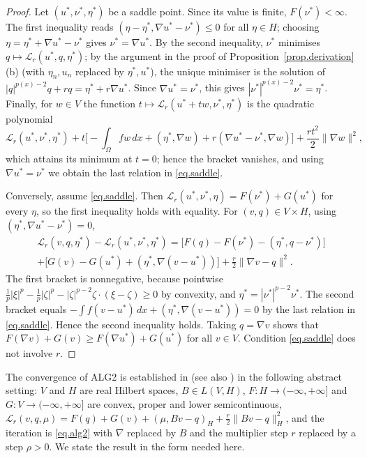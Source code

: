 \documentclass[11pt]{amsart}
\newcommand{\LL}{\mathcal L}
\newcommand{\dx}{\,dx}
\theoremstyle{definition}
\theoremstyle{remark}
\numberwithin{equation}{section}
\begin{document}
\begin{proof}
Let $(u^*,\nu^*,\eta^*)$ be a saddle point. Since its value is finite, $F(\nu^*)<\infty$. The first inequality reads $(\eta-\eta^*,\nabla u^*-\nu^*)\le 0$ for all $\eta\in H$; choosing $\eta=\eta^*+\nabla u^*-\nu^*$ gives $\nu^*=\nabla u^*$. By the second inequality, $\nu^*$ minimises $q\mapsto\LL_r(u^*,q,\eta^*)$; by the argument in the proof of Proposition~\ref{prop.derivation}(b) (with $\eta_n,u_n$ replaced by $\eta^*,u^*$), the unique minimiser is the solution of $|q|^{p(x)-2}q+rq=\eta^*+r\nabla u^*$. Since $\nabla u^*=\nu^*$, this gives $|\nu^*|^{p(x)-2}\nu^*=\eta^*$. Finally, for $w\in V$ the function $t\mapsto\LL_r(u^*+tw,\nu^*,\eta^*)$ is the quadratic polynomial
$$
\LL_r(u^*,\nu^*,\eta^*)+t\Big[-\int_\Omega fw\dx+(\eta^*,\nabla w)+r(\nabla u^*-\nu^*,\nabla w)\Big]+\frac{rt^2}2\|\nabla w\|^2,
$$
which attains its minimum at $t=0$; hence the bracket vanishes, and using $\nabla u^*=\nu^*$ we obtain the last relation in \eqref{eq.saddle}.

Conversely, assume \eqref{eq.saddle}. Then $\LL_r(u^*,\nu^*,\eta)=F(\nu^*)+G(u^*)$ for every $\eta$, so the first inequality holds with equality. For $(v,q)\in V\times H$, using $(\eta^*,\nabla u^*-\nu^*)=0$,
\begin{multline*}
\LL_r(v,q,\eta^*)-\LL_r(u^*,\nu^*,\eta^*)=\Big[F(q)-F(\nu^*)-(\eta^*,q-\nu^*)\Big]\\
+\Big[G(v)-G(u^*)+(\eta^*,\nabla(v-u^*))\Big]+\frac r2\|\nabla v-q\|^2 .
\end{multline*}
The first bracket is nonnegative, because pointwise $\frac1{p}|\xi|^{p}-\frac1p|\zeta|^p-|\zeta|^{p-2}\zeta\cdot(\xi-\zeta)\ge0$ by convexity, and $\eta^*=|\nu^*|^{p-2}\nu^*$. The second bracket equals $-\int f(v-u^*)\dx+(\eta^*,\nabla(v-u^*))=0$ by the last relation in \eqref{eq.saddle}. Hence the second inequality holds. Taking $q=\nabla v$ shows that $F(\nabla v)+G(v)\ge F(\nabla u^*)+G(u^*)$ for all $v\in V$. Condition \eqref{eq.saddle} does not involve $r$.
\end{proof}

The convergence of ALG2 is established in \cite[Chapter~VI, Theorem~5.1]{Glowinski} (see also \cite[Chapter~III]{FG}) in the following abstract setting: $V$ and $H$ are real Hilbert spaces, $B\in L(V,H)$, $F\colon H\to(-\infty,+\infty]$ and $G\colon V\to(-\infty,+\infty]$ are convex, proper and lower semicontinuous, $\LL_r(v,q,\mu)=F(q)+G(v)+(\mu,Bv-q)_H+\frac r2\|Bv-q\|_H^2$, and the iteration is \eqref{eq.alg2} with $\nabla$ replaced by $B$ and the multiplier step $r$ replaced by a step $\rho>0$. We state the result in the form needed here.
\end{document}
